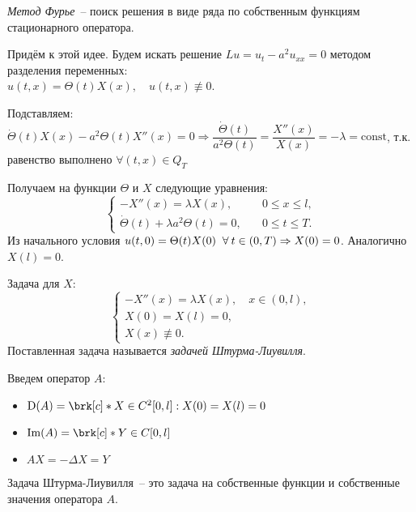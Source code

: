 {\it Метод Фурье}~-- поиск решения в виде ряда по собственным функциям стационарного оператора.

Придём к этой идее. Будем искать решение $Lu = u_t - a^2u_{xx} = 0$ методом разделения переменных: \\ $u(t,x) = \Theta(t) X(x), \quad u(t,x) \not\equiv 0$.

Подставляем: $\dot{\Theta}(t) X(x) - a^2\Theta(t) X''(x) = 0 \Rightarrow \dfrac{\dot{\Theta}(t)}{a^2\Theta(t)} = \dfrac{X''(x)}{X(x)} = -\lambda = \text{const}$, т.к. равенство выполнено $\forall (t,x) \in Q_T$

Получаем на функции $\Theta$ и $X$ следующие уравнения:
\begin{equation*}
	\begin{cases}
		-X''(x) = \lambda X(x), \quad & 0 \leq x \leq l, \\
		\dot{\Theta}(t) + \lambda a^2 \Theta(t) = 0, \quad & 0 \leq t \leq T.
	\end{cases}
\end{equation*}
Из начального условия $u(t,0) = \Theta(t)X(0) \;\;\forall\: t \in (0,T) \Rightarrow X(0) = 0$. Аналогично $X(l) = 0$.

Задача для $X$:
\begin{equation}
	\begin{cases}
		-X''(x) = \lambda X(x), \quad x \in (0,l), \\
		X(0) = X(l) = 0, \\
		X(x) \not\equiv 0.
	\end{cases}
\end{equation}
Поставленная задача называется {\it задачей Штурма-Лиувилля}.

Введем оператор $A$:
\begin{itemize}
	\item $\mathrm{D}(A) = \brk[c]*{X \in C^2[0,l] : X(0) = X(l) = 0}$
	\item $\mathrm{Im}(A) = \brk[c]*{Y \in C[0,l]}$
	\item $AX = -\Delta X = Y$
\end{itemize}

Задача Штурма-Лиувилля~-- это задача на собственные функции и собственные значения оператора $A$.

